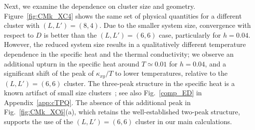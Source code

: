 \documentclass[twocolumn,superscriptaddress,showpacs, longbibliography, aps, prx]{revtex4-2}
\begin{document}
Next, we examine the dependence on cluster size and geometry. Figure~\ref{fig:CMk_XC4} shows the same set of physical quantities for a different cluster with $(L, L') = (8, 4)$. Due to the smaller system size, convergence with respect to $D$ is better than the $(L, L') = (6, 6)$ case, particularly for $h=0.04$. However, the reduced system size results in a qualitatively different temperature dependence in the specific heat and the thermal conductivity; we observe an additional upturn in the specific heat around $T\simeq 0.01$ for $h=0.04$, and a significant shift of the peak of $\kappa_{xy}/T$ to lower temperatures, relative to the $(L, L') = (6, 6)$ cluster. 
The three-peak structure in the specific heat is a known artifact of small size clusters~\cite{NasuUM2015}; see also Fig.~\ref{comp_ED} in Appendix~\ref{app:cTPQ}. The absence of this additional peak in Fig.~\ref{fig:CMk_XC6}(a), which retains the well-established two-peak structure, supports the use of the $(L, L') = (6, 6)$ cluster in our main calculations. 
\end{document}

